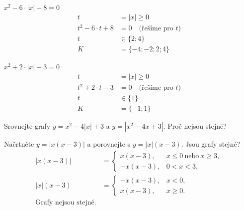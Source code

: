 \documentclass[11pt,a4paper]{article}
\begin{document}
\begin{zadaniReseniBox}[title={Samostatná práce 1}]
$x^{2} - 6 \cdot \left|{x}\right| + 8=0$
\tcblower
\[
\begin{aligned}
t&=|x|\ge0\\[2pt]
t^{2} - 6 \cdot t + 8&=0\quad\text{(řešíme pro }t\text{)}\\[2pt]
t&\in \{2;4\}\\[2pt]
K&=\{-4;-2;2;4\}
\end{aligned}
\]
\end{zadaniReseniBox}
\begin{zadaniReseniBox}[title={Samostatná práce 2}]
$x^{2} + 2 \cdot \left|{x}\right| - 3=0$
\tcblower
\[
\begin{aligned}
t&=|x|\ge0\\[2pt]
t^{2} + 2 \cdot t - 3&=0\quad\text{(řešíme pro }t\text{)}\\[2pt]
t&\in \{1\}\\[2pt]
K&=\{-1;1\}
\end{aligned}
\]
\end{zadaniReseniBox}
Srovnejte grafy $y=x^2-4|x|+3$ a $y=|x^2-4x+3|$. Proč nejsou stejné?
\begin{zadaniReseniBox}[title={Rozšíření 1}]
Načrtněte $y=|x(x-3)|$ a porovnejte s $y=|x|(x-3)$. Jsou grafy stejné?
\tcblower
\[\begin{aligned}
|x(x-3)|&=\begin{cases}x(x-3),&x\le0\ \text{nebo}\ x\ge3,\\-x(x-3),&0<x<3,\end{cases}\\|x|(x-3)&=\begin{cases}-x(x-3),&x<0,\\x(x-3),&x\ge0.\end{cases}\\\text{Grafy nejsou stejné.}&
\end{aligned}\]
\end{zadaniReseniBox}
\end{document}
